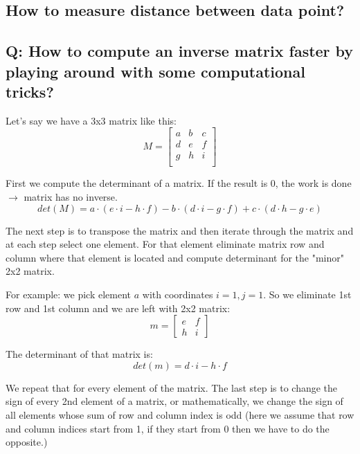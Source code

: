 \subsection{How to measure distance between data point?}
\subsection{Q: How to compute an inverse matrix faster by playing around with some computational tricks?}
\bigskip
Let's say we have a 3x3 matrix like this:
$$M = 
\begin{bmatrix}
a & b & c \\
d & e & f \\
g & h & i \\
\end{bmatrix}$$

First we compute the determinant of a matrix. If the result is 0, the work is done $\rightarrow$ matrix has no inverse. 
\bigskip
\[ det(M) = a \cdot (e \cdot i - h \cdot f) - b \cdot (d \cdot i - g \cdot f) + c \cdot (d \cdot h - g \cdot e) \]

\bigskip
The next step is to transpose the matrix and then iterate through the matrix and at each step select one element. For that element eliminate matrix row and column where that element is located and compute determinant for the "minor" 2x2 matrix.

For example: we pick element $a$ with coordinates $i=1,  j=1$. So we eliminate 1st row and 1st column and we are left with 2x2 matrix:
\bigskip
\[ m = 
\begin{bmatrix}
e & f\\
h & i
\end{bmatrix}
\]

\bigskip
The determinant of that matrix is:
\bigskip
\[ det(m) = d \cdot i - h \cdot f \]

\bigskip
We repeat that for every element of the matrix.
The last step is to change the sign of every 2nd element of a matrix, or mathematically, we change the sign of all elements whose sum of row and column index is odd (here we assume that row and column indices start from 1, if they start from 0 then we have to do the opposite.)